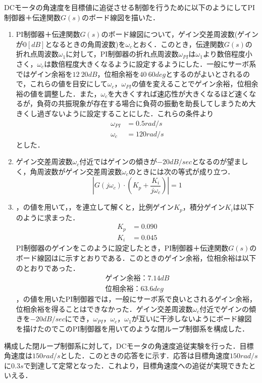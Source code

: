 DCモータの角速度を目標値に追従させる制御を行うために以下のようにしてPI制御器＋伝達関数$G(s)$のボード線図を描いた．

\begin{enumerate}
\item PI制御器＋伝達関数$G(s)$のボード線図について，ゲイン交差周波数(ゲインが$0[dB]$となるときの角周波数)を$\omega_{c}$とおく．このとき，伝達関数$G(s)$の折れ点周波数$\omega_{1}$に対して，PI制御器の折れ点周波数$\omega_{PI}$は$\omega_{1}$より数倍程度小さく，$\omega_{c}$は数倍程度大きくなるように設定するようにした．一般にサーボ系ではゲイン余裕を$12~20\unit{dB}$，位相余裕を$40~60\unit{deg}$とするのがよいとされるので，これらの値を目安にして$\omega_{c}$，$\omega_{PI}$の値を変えることでゲイン余裕，位相余裕の値を調整した．また，$\omega_{c}$を大きくすれば速応性が大きくなるほど速くなるが，負荷の共振現象が存在する場合に負荷の振動を助長してしまうため大きくし過ぎないように設定することにした．これらの条件より
\begin{align}
 \omega_{PI}&=0.5\unit{rad/s}\label{eq::omega_PI_value}\\
 \omega_{c}&=120\unit{rad/s}\label{eq::omega_c_value}
\end{align}
とした．
\item ゲイン交差周波数$\omega_{c}$付近ではゲインの傾きが$-20\unit{dB/sec}$となるのが望ましく，角周波数がゲイン交差周波数$\omega_{c}$のときには次の等式が成り立つ．
\begin{equation}
|G(j\omega_{c})\cdot(K_{p}+\frac{K_{i}}{j\omega_{c}})|=1\label{eq::omega_c_1}
\end{equation}
\item {}，の値を用いて，，を連立して解くと，比例ゲイン$K_{p}$，積分ゲイン$K_{i}$は以下のように求まった．
\begin{align}
K_{p}&=0.090\label{eq::K_p_value}\\
K_{i}&=0.045\label{eq::K_i_value}
\end{align}
PI制御器のゲインをこのように設定したとき，PI制御器＋伝達関数$G(s)$のボード線図はに示すとおりである．このときのゲイン余裕，位相余裕は以下のとおりであった．
\begin{align}
ゲイン余裕：7.14\unit{dB}\\
位相余裕：63.6\unit{deg}
\end{align}
，の値を用いたPI制御器では，一般にサーボ系で良いとされるゲイン余裕，位相余裕を得ることはできなかった．ゲイン交差周波数$\omega_{c}$付近でゲインの傾きを$-20\unit{dB/sec}$にでき，$\omega_{PI}$，$\omega_{c}$，$\omega_{1}$が互いに干渉しないようにボード線図を描けたのでこのPI制御器を用いてのような閉ループ制御系を構成した．
\end{enumerate}
構成した閉ループ制御系に対して，DCモータの角速度追従実験を行った．目標角速度は$150\unit{rad/s}$とした．このときの応答をに示す．応答は目標角速度$150\unit{rad/s}$に$0.3\unit{s}$で到達して定常となった．これより，目標角速度への追従が実現できたといえる．

